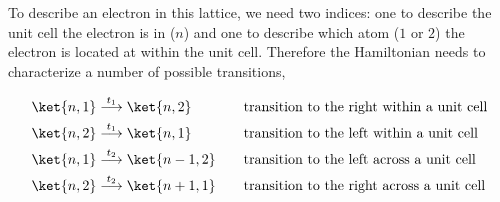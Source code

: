 \documentclass{article}
\begin{document}
To describe an electron in this lattice, we need two indices: one to describe the unit cell the electron is in ($n$) and one to describe which atom ($1$ or $2$) the electron is located at within the unit cell. Therefore the Hamiltonian needs to characterize a number of possible transitions,

\begin{alignat*}{2}
    \ket{n, 1} &\stackrel{t_1}{\longrightarrow} \ket{n, 2} \quad &&\text{transition to the right within a unit cell} \\
    \ket{n, 2} &\stackrel{t_1}{\longrightarrow} \ket{n, 1} \quad &&\text{transition to the left within a unit cell} \\
    \ket{n, 1} &\stackrel{t_2}{\longrightarrow} \ket{n-1, 2} \quad &&\text{transition to the left across a unit cell} \\
    \ket{n, 2} &\stackrel{t_2}{\longrightarrow} \ket{n+1, 1} \quad &&\text{transition to the right across a unit cell}
\end{alignat*}
\end{document}
